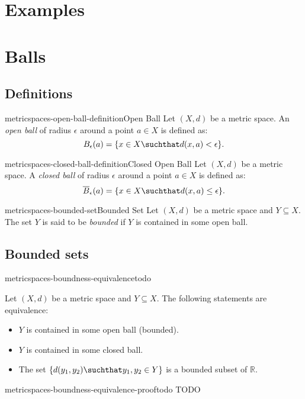 \documentclass[preview]{standalone}
\begin{document}
\section{Examples}


\section{Balls}

\subsection{Definitions}

\begin{snippetdefinition}{metricspaces-open-ball-definition}{Open Ball}{
    Let \((X, d)\) be a metric space.
    An \textit{open ball} of radius \(\epsilon\) around a point
    \(a \in X\) is defined as:
    \[
        B_\epsilon(a) = \{x \in X \suchthat d(x,a) < \epsilon\}.
    \]
}
\end{snippetdefinition}

\begin{snippetdefinition}{metricspaces-closed-ball-definition}{Closed Open Ball}{
    Let \((X, d)\) be a metric space.
    A \textit{closed ball} of radius \(\epsilon\) around a point
    \(a \in X\) is defined as:
    \[
        \overline{B}_\epsilon(a) = \{x \in X \suchthat d(x,a) \leq \epsilon\}.
    \]
}
\end{snippetdefinition}

\begin{snippetdefinition}{metricspaces-bounded-set}{Bounded Set}{
    Let \((X, d)\) be a metric space and \(Y \subseteq X\).
    The set \(Y\) is said to be \textit{bounded} if \(Y\)
    is contained in some open ball.
}
\end{snippetdefinition}

\subsection{Bounded sets}

\begin{snippetlemma}{metricspaces-boundness-equivalence}{todo}{
    Let \((X, d)\) be a metric space and \(Y \subseteq X\).
    The following statements are equivalence:
    \begin{itemize}
        \item \(Y\) is contained in some open ball (bounded).
        \item \(Y\) is contained in some closed ball.
        \item The set \(\{d(y_1,y_2) \suchthat y_1, y_2 \in Y\}\)
            is a bounded subset of \(\mathbb{R}\).
    \end{itemize}
}
\end{snippetlemma}

\begin{snippetproof}{metricspaces-boundness-equivalence-proof}{todo}{
    TODO
}
\end{snippetproof}
\end{document}

